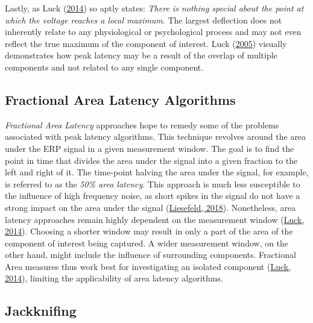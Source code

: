 \documentclass[
  man]{apa7}
\begin{document}
Lastly, as Luck (\protect\hyperlink{ref-luck2014introduction}{2014}) so aptly states: \emph{There is nothing special about the point at which the voltage reaches a local maximum}. The largest deflection does not inherently relate to any physiological or psychological process and may not even reflect the true maximum of the component of interest. Luck (\protect\hyperlink{ref-luck2005ten}{2005}) visually demonstrates how peak latency may be a result of the overlap of multiple components and not related to any single component.

\hypertarget{fractional-area-latency-algorithms}{%
\subsection{Fractional Area Latency Algorithms}\label{fractional-area-latency-algorithms}}

\emph{Fractional Area Latency} approaches hope to remedy some of the problems associated with peak latency algorithms. This technique revolves around the area under the ERP signal in a given measurement window. The goal is to find the point in time that divides the area under the signal into a given fraction to the left and right of it. The time-point halving the area under the signal, for example, is referred to as the \emph{50\% area latency}. This approach is much less susceptible to the influence of high frequency noise, as short spikes in the signal do not have a strong impact on the area under the signal (\protect\hyperlink{ref-liesefeld2018estimating}{Liesefeld, 2018}). Nonetheless, area latency approaches remain highly dependent on the measurement window (\protect\hyperlink{ref-luck2014introduction}{Luck, 2014}). Choosing a shorter window may result in only a part of the area of the component of interest being captured. A wider measurement window, on the other hand, might include the influence of surrounding components. Fractional Area measures thus work best for investigating an isolated component (\protect\hyperlink{ref-luck2014introduction}{Luck, 2014}), limiting the applicability of area latency algorithms.

\hypertarget{jackknifing}{%
\subsection{Jackknifing}\label{jackknifing}}
\end{document}
